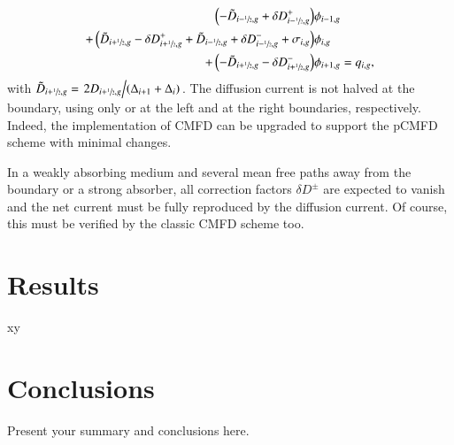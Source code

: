 \begin{equation}
  \label{eq:pCMFD-rearrange}
  \begin{split}
  \left(-\tilde{D}_{i-\sfrac{1}{2},g}+\delta D^+_{i-\sfrac{1}{2},g}\right)&\phi_{i-1,g} \\
  + \left( \tilde{D}_{i+\sfrac{1}{2},g} - \delta D^+_{i+\sfrac{1}{2},g} + \tilde{D}_{i-\sfrac{1}{2},g} + \delta D^-_{i-\sfrac{1}{2},g} + \sigma_{i,g}\right)&\phi_{i,g} \\
  + \left( -\tilde{D}_{i+\sfrac{1}{2},g} - \delta D^-_{i+\sfrac{1}{2},g}\right)&\phi_{i+1,g} = q_{i,g},
  \end{split}
\end{equation}
with $\tilde{D}_{i+\sfrac{1}{2},g} = \left. 2D_{i+\sfrac{1}{2},g} \middle/ (\Delta_{i+1}+\Delta_{i})\right.$. The diffusion current is not halved at the boundary, using only  or  at the left and at the right boundaries, respectively. Indeed, the implementation of CMFD can be upgraded to support the pCMFD scheme with minimal changes.

In a weakly absorbing medium and several mean free paths away from the boundary or a strong absorber, all correction factors $\delta D^\pm$ are expected to vanish and the net current must be fully reproduced by the diffusion current. Of course, this must be verified by the classic CMFD scheme too.

\section{Results}
\label{sec:res}

xy

\section{Conclusions}
\label{sec:conc}

Present your summary and conclusions here.

%
